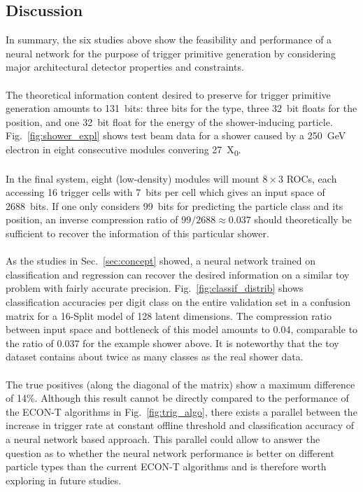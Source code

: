 \documentclass[../../main.tex]{subfiles}
\begin{document}
\subsection{Discussion}
In summary, the six studies above show the feasibility and performance of a neural network for the purpose of trigger primitive generation by considering major architectural detector properties and constraints.\\
\\
The theoretical information content desired to preserve for trigger primitive generation amounts to \SI{131}{bits}: three bits for the type, three \SI{32}{bit} floats for the position, and one \SI{32}{bit} float for the energy of the shower-inducing particle. Fig.~\ref{fig:shower_expl} shows test beam data for a shower caused by a \SI{250}{GeV} electron in eight consecutive modules convering \SI{27}{X_0}.\\
\\
In the final system, eight (low-density) modules will mount $8\times3$ ROCs, each accessing 16 trigger cells with \SI{7}{bits} per cell which gives an input space of \SI{2688}{bits}. If one only considers \SI{99}{bits} for predicting the particle class and its position, an inverse compression ratio of $99/2688\approx0.037$ should theoretically be sufficient to recover the information of this particular shower.\\
\\
As the studies in Sec.~\ref{sec:concept} showed, a neural network trained on classification and regression can recover the desired information on a similar toy problem with fairly accurate precision. Fig.~\ref{fig:classif_distrib} shows classification accuracies per digit class on the entire validation set in a confusion matrix for a 16-Split model of 128 latent dimensions. The compression ratio between input space and bottleneck of this model amounts to 0.04, comparable to the ratio of 0.037 for the example shower above. It is noteworthy that the toy dataset contains about twice as many classes as the real shower data.\\
\\
The true positives (along the diagonal of the matrix) show a maximum difference of 14\%. Although this result cannot be directly compared to the performance of the ECON-T algorithms in Fig.~\ref{fig:trig_algo}, there exists a parallel between the increase in trigger rate at constant offline threshold and classification accuracy of a neural network based approach. This parallel could allow to answer the question as to whether the neural network performance is better on different particle types than the current ECON-T algorithms and is therefore worth exploring in future studies.\\
\end{document}
